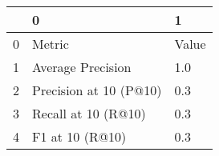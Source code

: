 \begin{tabular}{lll}
\toprule
{} &                       0 &      1 \\
\midrule
0 &                  Metric &  Value \\
1 &       Average Precision &    1.0 \\
2 &  Precision at 10 (P@10) &    0.3 \\
3 &     Recall at 10 (R@10) &    0.3 \\
4 &         F1 at 10 (R@10) &    0.3 \\
\bottomrule
\end{tabular}
